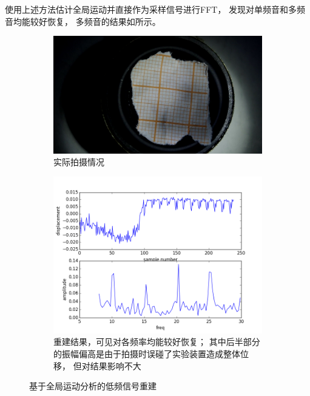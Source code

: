 使用上述方法估计全局运动并直接作为采样信号进行FFT，
发现对单频音和多频音均能较好恢复，
多频音的结果如所示。
\begin{figure}[h!]\begin{center}
    \begin{subfigure}[b]{.5\figwidth}
        \includegraphics[width=.5\figwidth]{res/setting.png}
        \caption{实际拍摄情况}
    \end{subfigure}
    \begin{subfigure}[b]{.5\figwidth}
        \includegraphics[width=.5\figwidth]{res/global-recon.png}
        \caption{重建结果，可见对各频率均能较好恢复；
            其中后半部分的振幅偏高是由于拍摄时误碰了实验装置造成整体位移，
            但对结果影响不大}
    \end{subfigure}
    \caption{基于全局运动分析的低频信号重建}
    \label{fig:real:lowfreq}
\end{center}\end{figure}

